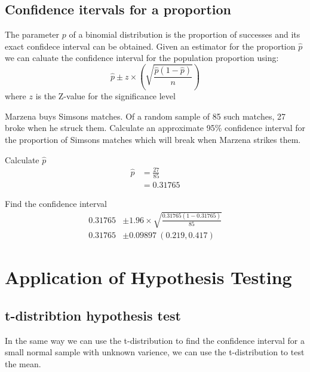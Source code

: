     \newpage
    \subsection{Confidence itervals for a proportion}
        The parameter $p$ of a binomial distribution is the proportion of successes and its exact confidece interval can be obtained. Given an estimator for the proportion $\hat{p}$ we can caluate the confidence interval for the population proportion using: 
        $$\hat{p} \pm z \times \left(\sqrt{\frac{\hat{p}(1-\hat{p})}{n}}\right)$$ 
        where $z$ is the Z-value for the significance level

        \begin{example}
        {
            Marzena buys Simsons matches. Of a random sample of 85 such matches, 27 broke when he struck them. Calculate an approximate 95\% confidence interval for the proportion of Simsons matches which will break when Marzena strikes them.
        }

        \begin{step}{Calculate $\hat{p}$}
        \begin{align*}
        \hat{p} &= \frac{27}{85} \\
                &= 0.31765
        \end{align*}
        \end{step}

        \begin{step}{Find the confidence interval}
        \begin{align*}
        0.31765 &\pm 1.96 \times \sqrt{\frac{0.31765(1-0.31765)}{85}} \\ 
        0.31765 &\pm 0.09897\ (0.219, 0.417) 
        \end{align*}
        \end{step}

        \end{example}

\newpage
\section{Application of Hypothesis Testing}

    \newpage
    \subsection{t-distribtion hypothesis test}
        In the same way we can use the t-distribution to find the confidence interval for a small normal sample with unknown varience, we can use the t-distribution to test the mean.

